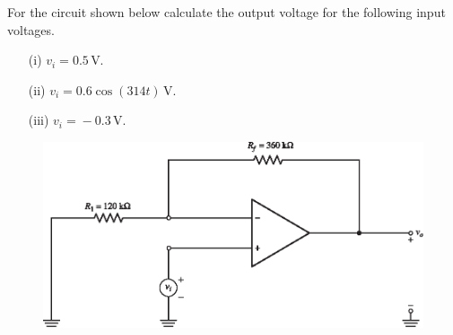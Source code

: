 
\medskip

\begin{example}\label{exam5.12}
For the circuit shown below calculate the output voltage for the following input voltages.
\begin{itemize}
\item[(i)] $v_{i}=0.5\,$V.

\item[(ii)] $v_{i}=0.6\cos (314t)$\,V.

\item[(iii)] $v_{i}={}-0.3\,$V.
\end{itemize}
\begin{figure}[H]
\centering
\includegraphics[scale=1.1]{chap4/S3-EE-06-IN007.eps}
\end{figure}
\end{example}

